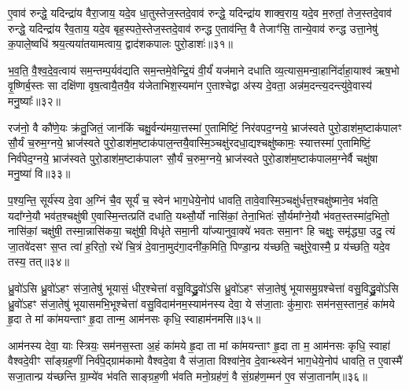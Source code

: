 ए॒वाव॑ रुन्द्धे॒ यदिन्द्रा॑य वैरा॒जाय॒ यदे॒व धा॒तुस्तेज॒स्तदे॒वाव॑ रुन्द्धे॒ यदिन्द्रा॑य शाक्व॒राय॒ यदे॒व म॒रुतां॒ तेज॒स्तदे॒वाव॑ रुन्द्धे॒ यदिन्द्रा॑य रैव॒ताय॒ यदे॒व बृह॒स्पते॒स्तेज॒स्तदे॒वाव॑ रुन्द्ध ए॒ताव॑न्ति॒ वै तेजाꣳ॑सि॒ तान्ये॒वाव॑ रुन्द्ध उत्ता॒नेषु॑ क॒पाले॒ष्वधि॑ श्रय॒त्यया॑तयामत्वाय॒ द्वाद॑शकपालः पुरो॒डाशः॑॥३१॥

भ॒व॒ति॒ वै॒श्व॒दे॒व॒त्वाय॑ सम॒न्तम्प॒र्यव॑द्यति सम॒न्तमे॒वेन्द्रि॒यं वी॒र्यं॑ यज॑माने दधाति व्य॒त्यास॒मन्वा॒हानि॑र्दाहा॒याश्व॑ ऋष॒भो वृ॒ष्णिर्ब॒स्तः सा दक्षि॑णा वृष॒त्वायै॒तयै॒व य॑जेताभिश॒स्यमा॑न ए॒ताश्चेद्वा अ॑स्य दे॒वता॒ अन्न॑म॒दन्त्य॒दन्त्यु॑वे॒वास्य॑ मनु॒ष्याः᳚॥३२॥

{\anuvakamend[{इ॒न्द्रि॒यका॑मः सवि॒तुस्तेज॒स्तत्पु॑रो॒डाशो॒\-ऽष्टात्रिꣳ॑शच्च॥७॥}]}

रज॑नो॒ वै कौ॑णे॒यः क्र॑तु॒जितं॒ जान॑किं चक्षु॒र्वन्य॑मया॒त्तस्मा॑ ए॒तामिष्टिं॒ निर॑वपद॒ग्नये॒ भ्राज॑स्वते पुरो॒डाश॑म॒ष्टाक॑पालꣳ सौ॒र्यं च॒रुम॒ग्नये॒ भ्राज॑स्वते पुरो॒डाश॑म॒ष्टाक॑पाल॒न्तयै॒वास्मि॒ञ्चक्षु॑रदधा॒द्यश्चक्षु॑ष्कामः॒ स्यात्तस्मा॑ ए॒तामिष्टिं॒ निर्व॑पेद॒ग्नये॒ भ्राज॑स्वते पुरो॒डाश॑म॒ष्टाक॑पालꣳ सौ॒र्यं च॒रुम॒ग्नये॒ भ्राज॑स्वते पुरो॒डाश॑म॒ष्टाक॑पालम॒ग्नेर्वै चक्षु॑षा मनु॒ष्या॑ वि॥३३॥

प॒श्य॒न्ति॒ सूर्य॑स्य दे॒वा अ॒ग्निं चै॒व सूर्यं॑ च॒ स्वेन॑ भाग॒धेये॒नोप॑ धावति॒ तावे॒वास्मि॒ञ्चक्षु॑र्धत्त॒श्चक्षु॑ष्माने॒व भ॑वति॒ यदा᳚ग्ने॒यौ भव॑त॒श्चक्षु॑षी ए॒वास्मि॒न्तत्प्रति॑ दधाति॒ यथ्सौ॒र्यो नासि॑कां॒ तेना॒भितः॑ सौ॒र्यमा᳚ग्ने॒यौ भ॑वत॒स्तस्मा॑द॒भितो॒ नासि॑कां॒ चक्षु॑षी॒ तस्मा॒न्नासि॑कया॒ चक्षु॑षी॒ विधृ॑ते समा॒नी या᳚ज्यानुवा॒क्ये॑ भवतः समा॒नꣳ हि चक्षुः॒ समृ॑द्ध्या॒ उदु॒ त्यं जा॒तवे॑दसꣳ स॒प्त त्वा॑ ह॒रितो॒ रथे॑ चि॒त्रं दे॒वाना॒मुद॑गा॒दनी॑क॒मिति॒ पिण्डा॒न्प्र य॑च्छति॒ चक्षु॑रे॒वास्मै॒ प्र य॑च्छति॒ यदे॒व तस्य॒ तत्॥३४॥

{\anuvakamend[{वि ह्य॑ष्टाविꣳ॑शतिश्च॥८॥}]}

ध्रु॒वो॑\-ऽसि ध्रु॒वो॑\-ऽहꣳ स॑जा॒तेषु॑ भूयासं॒ धीर॒श्चेत्ता॑ वसु॒विद्ध्रु॒वो॑\-ऽसि ध्रु॒वो॑\-ऽहꣳ स॑जा॒तेषु॑ भूयासमु॒ग्रश्चेत्ता॑ वसु॒विद्ध्रु॒वो॑\-ऽसि ध्रु॒वो॑\-ऽहꣳ स॑जा॒तेषु॑ भूयासमभि॒भूश्चेत्ता॑ वसु॒विदाम॑नम॒स्याम॑नस्य देवा॒ ये स॑जा॒ताः कु॑मा॒राः सम॑नस॒स्तान॒हं का॑मये हृ॒दा ते मां का॑मयन्ताꣳ हृ॒दा तान्म॒ आम॑नसः कृधि॒ स्वाहाम॑नमसि॥३५॥

आम॑नस्य देवा॒ याः स्त्रियः॒ सम॑नस॒स्ता अ॒हं का॑मये हृ॒दा ता मां का॑मयन्ताꣳ हृ॒दा ता म॒ आम॑नसः कृधि॒ स्वाहा॑ वैश्वदे॒वीꣳ सा᳚ङ्ग्रह॒णीं निर्व॑पे॒द्ग्राम॑कामो वैश्वदे॒वा वै स॑जा॒ता विश्वा॑ने॒व दे॒वान्थ्स्वेन॑ भाग॒धेये॒नोप॑ धावति॒ त ए॒वास्मै॑ सजा॒तान्प्र य॑च्छन्ति ग्रा॒म्ये॑व भ॑वति साङ्ग्रह॒णी भ॑वति मनो॒ग्रह॑णं॒ वै सं॒ग्रह॑ण॒म्मन॑ ए॒व स॑जा॒ताना᳚म्॥३६॥

